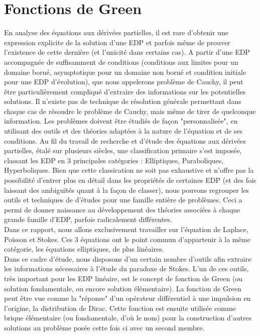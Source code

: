 \chapter{Fonctions de Green}

En analyse des équations aux dérivées partielles, il est rare d'obtenir une expression explicite de la solution d'une EDP et parfois même de prouver l'existence de cette dernière (et l'unicité dans certains cas).
A partir d'une EDP accompagnée de suffisamment de conditions (conditions aux limites pour un domaine borné, asymptotique pour un domaine non borné et condition initiale pour une EDP d'évolution), que nous appelerons problème de Cauchy, il peut être particulièrement compliqué d'extraire des informations sur les potentielles solutions. Il n'existe pas de 
technique de résolution générale permettant dans chaque cas de résoudre le problème de Cauchy, mais même de tirer de quelconque information. Les problèmes doivent être étudiés de façon "personnalisée", en utilisant des outils et des théories adaptées à la nature de l'équation et de ses conditions.
Au fil du travail de recherche et d'étude des équations aux dérivées partielles, étalé sur plusieurs siècles, une classification primaire s'est imposée, classant les EDP en 3 principales catégories : Elliptiques, Paraboliques, Hyperboliques. Bien que cette classication ne soit pas exhaustive et n'offre pas la possibilité d'entrer plus en détail dans les propriétés de certaines EDP (et des fois laissant des ambiguïtés quant à la façon de classer),
nous pouvons regrouper les outils et techniques de d'études pour une famille entière de problèmes. Ceci a permi de donner naissance au développement des théories associées à chaque grande famille d'EDP, parfois radicalement différentes.\\
Dans ce rapport, nous allons exclusivement travailler sur l'équation de Laplace, Poisson et Stokes. Ces 3 équations ont le point commun d'appartenir à la même catégorie, les équations elliptiques, de plus linéaires.\\
Dans ce cadre d'étude, nous disposons d'un certain nombre d'outils afin extraire les informations nécessaires à l'étude du paradoxe de Stokes. L'un de ces outils, très important pour les EDP linéaire, est le concept de fonction de Green (ou solution fondamentale, ou encore solution élémentaire). La fonction de Green peut être vue comme la "réponse" d'un
opérateur différentiel à une impulsion en l'origine, la distribution de Dirac. Cette fonction est ensuite utilisée comme brique élémentaire (ou fondamentale, d'où le nom) pour la construction d'autres solutions au problème posée cette fois ci avec un second membre.
